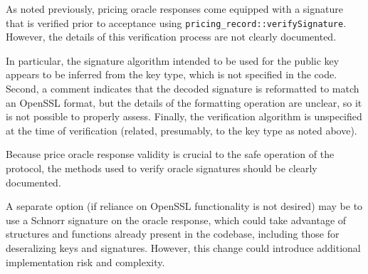 \documentclass{article}
\begin{document}
As noted previously, pricing oracle responses come equipped with a signature that is verified prior to acceptance using \texttt{pricing\_record::verifySignature}.
However, the details of this verification process are not clearly documented.

In particular, the signature algorithm intended to be used for the public key appears to be inferred from the key type, which is not specified in the code.
Second, a comment indicates that the decoded signature is reformatted to match an OpenSSL format, but the details of the formatting operation are unclear, so it is not possible to properly assess.
Finally, the verification algorithm is unspecified at the time of verification (related, presumably, to the key type as noted above).

Because price oracle response validity is crucial to the safe operation of the protocol, the methods used to verify oracle signatures should be clearly documented.

A separate option (if reliance on OpenSSL functionality is not desired) may be to use a Schnorr signature on the oracle response, which could take advantage of structures and functions already present in the codebase, including those for deseralizing keys and signatures.
However, this change could introduce additional implementation risk and complexity.
\end{document}
